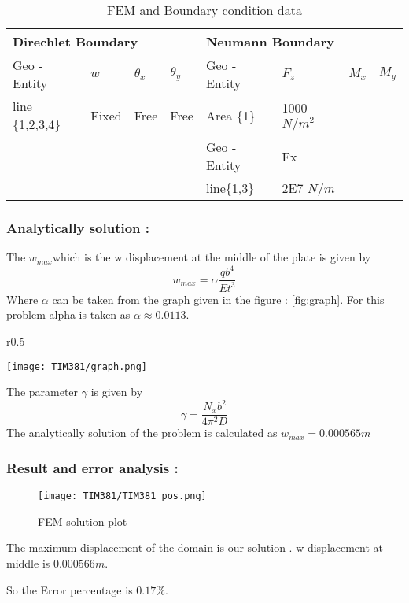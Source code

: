 \documentclass[VM.tex]{subfiles}
\begin{document}
\begin{table}[h!]
\renewcommand{\arraystretch}{1.5}
\centering
\caption{FEM and Boundary condition data}
\label{my-label}
\begin{tabular}{|l|lll|l|lll|}
\hline
 \multicolumn{4}{l|}{\cellcolor[HTML]{C0C0C0}Direchlet Boundary} & \multicolumn{4}{l|}{\cellcolor[HTML]{C0C0C0}Neumann Boundary} \\ \hline \hline
Geo - \newline Entity      & $w$          & $\theta _ x$     & $\theta _ y $    & Geo - \newline Entity         & $F_z$        & $M_x$        & $M_y$        \\    
                 line \{1,2,3,4\}                   & Fixed      & Free         & Free        & Area \{1\}                    & 1000 $N/m^2$        &           &           \\ \hline & & & & Geo - \newline Entity         & Fx & &     
\\ \ & & & & line\{1,3\} & 2E7 $N/m$ & &

 \\ \hline
\end{tabular}
\end{table}
\subsubsection*{Analytically solution : }
The $w_{max}$which is the w displacement at the middle of the plate is given by
\begin{equation}
w_{max}=\alpha \frac{qb^4}{E t ^ 3}
\end{equation}
Where $\alpha$ can be taken from the graph given in the figure : \ref{fig:graph}. For this problem alpha is taken as $\alpha \approx 0.0113 $.
\begin{wrapfigure}{r}{0.5\textwidth}
\begin{center}
\texttt{[image: TIM381/graph.png]}
\end{center}
\caption{Graph to find $\alpha$ . }
\label{fig:graph}
\end{wrapfigure}

The parameter $\gamma$ is given by 
\begin{equation}
\gamma = \frac{N_xb^2}{4\pi^2D}
\end{equation}
The analytically solution of the problem is calculated as $w_{max} =0.000565m $

\subsubsection*{Result and error analysis : }

\begin{figure}[h!]
\centering
{}%
  \texttt{[image: TIM381/TIM381\_pos.png]}
  \caption{FEM solution plot}\label{fig:awesome_image3}
\endminipage
\end{figure}
The maximum displacement of the domain is our solution . w displacement at middle is $ 0.000566 m $.


So the Error percentage is $ 0.17 \% $. 
\vspace{5cm}
\end{document}
